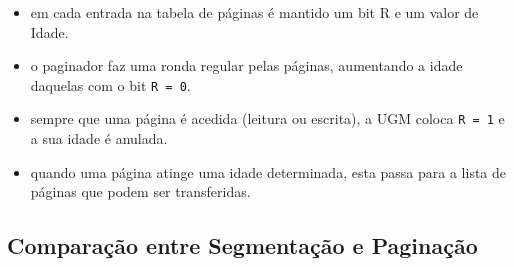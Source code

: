 \documentclass[11pt]{article}
\begin{document}
\begin{itemize}
\begin{itemize}
              \item em cada entrada na tabela de páginas é mantido um bit R e um valor de Idade.
              \item o paginador faz uma ronda regular pelas páginas, aumentando a idade daquelas com o bit \lstinline|R = 0|.
              \item sempre que uma página é acedida (leitura ou escrita), a UGM coloca \lstinline|R = 1| e a sua idade é anulada.
              \item quando uma página atinge uma idade determinada, esta passa para a lista de páginas que podem ser transferidas.
          \end{itemize}
\end{itemize}

\subsection{Comparação entre Segmentação e Paginação}
\end{document}
